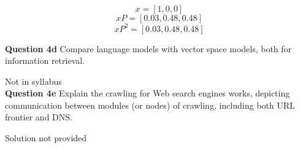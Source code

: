 \documentclass[11pt,a4paper]{report}
\begin{document}
\begin{multicols*}{2}
$$x = [1,0,0]$$
$$xP = [0.03, 0.48, 0.48]$$
$$xP^2 = [0.03, 0.48, 0.48]$$

\noindent \textbf{Question 4d} Compare language models with vector space models, both for information retrieval.

\noindent Not in syllabus\\

\noindent \textbf{Question 4e} Explain the crawling for Web search engines works, depicting communication between modules (or nodes) of crawling, including both URL frontier and DNS.

\noindent Solution not provided

\end{multicols*}
\end{document}
